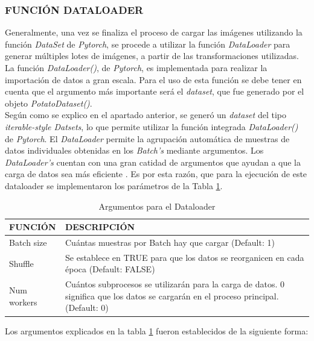 		
			\subsubsection{FUNCIÓN DATALOADER}			
						
			Generalmente, una vez se finaliza el proceso de cargar las imágenes utilizando la función \textit{DataSet} de \textit{Pytorch}, se procede a utilizar la función \textit{DataLoader} para generar múltiples lotes de imágenes, a partir de las transformaciones utilizadas. La función \textit{DataLoader()}, de \textit{Pytorch}, es implementada para realizar la importación de datos a gran escala. Para el uso de esta función se debe tener en cuenta que el argumento más importante será el \textit{dataset}, que fue generado por el objeto \textit{PotatoDataset()}. \\
			
			Según como se explico en el apartado anterior, se generó un \textit{dataset} del tipo \textit{iterable-style Datsets}, lo que permite utilizar la función integrada \textit{DataLoader()} de \textit{Pytorch}. El \textit{DataLoader} permite la agrupación automática de muestras de datos individuales obtenidas en los \textit{Batch's} mediante argumentos. Los \textit{DataLoader's} cuentan con una gran catidad de argumentos que ayudan a que la carga de datos sea más eficiente \cite{Pytorch}. Es por esta razón, que para la ejecución de este dataloader se implementaron los parámetros de la Tabla \ref{table:Argumentos}.
\newpage			
			\begin{table}[ht]
				\centering
				\begin{tabular}{|p{3cm}|p{8cm}|}
					\hline
					FUNCIÓN & DESCRIPCIÓN \\ 
					\hline
					Batch size & Cuántas muestras por Batch hay que cargar (Default: 1)\\
					\hline
					Shuffle & Se establece en TRUE para que los datos se reorganicen en cada época (Default: FALSE)  \\
					\hline
					Num workers & Cuántos subprocesos se utilizarán para la carga de datos. 0 significa que los datos se cargarán en el proceso principal. (Default: 0)\\
					\hline
				\end{tabular}	
				\caption{Argumentos para el Dataloader}
				\label{table:Argumentos}
			\end{table}
		
		Los argumentos explicados en la tabla \ref{table:Argumentos} fueron establecidos de la siguiente forma:
		
